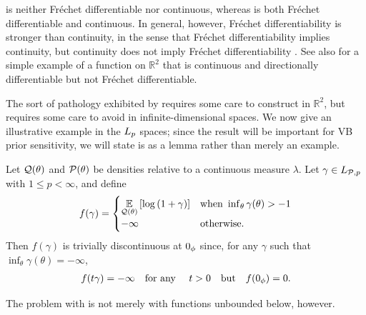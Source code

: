  is neither Fr{\'e}chet differentiable nor continuous,
whereas  is both Fr{\'e}chet differentiable and
continuous.  In general, however, Fr{\'e}chet differentiability is stronger than
continuity, in the sense that Fr{\'e}chet differentiability implies continuity,
but continuity does not imply Fr{\'e}chet differentiability \citep[Proposition
4.8 (d)]{zeidler:2013:functional}.  See also \citet[Example
1.9]{averbukh:1967:theory} for a simple example of a function on $\mathbb{R}^2$
that is continuous and directionally differentiable but not Fr{\'e}chet
differentiable.

The sort of pathology exhibited by 
requires some care to construct in $\mathbb{R}^2$, but requires some care to
avoid in infinite-dimensional spaces.  We now give an illustrative example in
the ${L_{p}}$ spaces; since the result will be important for VB prior
sensitivity, we will state is as a lemma rather than merely an example.


\begin{ex}
%
Let $\mathcal{Q}(\theta)$ and $\mathcal{P}(\theta)$ be densities relative to a continuous measure
$\lambda$.  Let $\gamma \in {L_{\mathcal{P},p}}$ with $1 \le p < \infty$, and define
%
\begin{align*}
%
f(\gamma) = \begin{cases}
\expect{\q(\theta)}{\log\left(1 + \gamma\right)}
    & \textrm{when }\inf_\theta \gamma(\theta) > -1 \\
-\infty & \textrm{otherwise}.
\end{cases}
%
\end{align*}
%
Then $f(\gamma)$ is trivially discontinuous at $0_\phi$ since, for any $\gamma$
such that $\inf_\theta \gamma(\theta) = -\infty$,
%
\begin{align*}
%
f(\t \gamma) = -\infty \mathtxt{for any }\t > 0 \mathtxt{but} f(\phiz) = 0.
%
\end{align*}
%
\end{ex}

The problem with  is not merely with
functions unbounded below, however.

